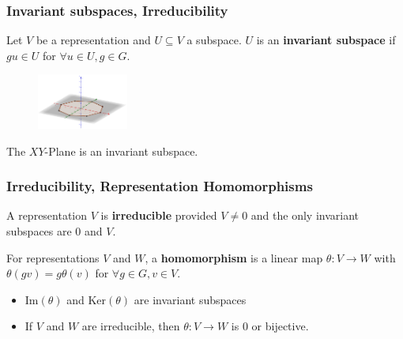 \documentclass{beamer}
\newcommand{\Img}{\text{Im}}
\newcommand{\Ker}{\text{Ker}}
\begin{document}

\begin{frame}
\frametitle{Invariant subspaces, Irreducibility}
\begin{definition}
Let \(V\) be a representation and \(U \subseteq V\) a subspace. \(U\) is an \textbf{invariant subspace} if \(gu \in U\) for \(\forall u\in U, g \in G\).
\end{definition}
\pause
\begin{example}
\begin{figure}[h]
\begin{center}
\includegraphics[width = 3cm]{images/octagon.png}
\end{center}
\end{figure}
\pause
The \(XY\)-Plane is an invariant subspace.
\end{example}
\end{frame}


\begin{frame}
\frametitle{Irreducibility, Representation Homomorphisms}
\begin{definition}
A representation \(V\) is \textbf{irreducible} provided \(V \neq 0\) and the only invariant subspaces are 0 and \(V\).
\end{definition}
\pause
\begin{definition}
For representations \(V\) and \(W\), a \textbf{homomorphism} is a linear map \(\theta: V\to W\) with \(\theta(gv) = g\theta(v)\) for \(\forall g\in G, v\in V\).
\end{definition}
\pause
\begin{itemize}
\item \(\Img (\theta)\) and \(\Ker (\theta)\) are invariant subspaces
\item If \(V\) and \(W\) are irreducible, then \(\theta: V \to W\) is 0 or bijective.
\end{itemize}
\end{frame}

\end{document}
